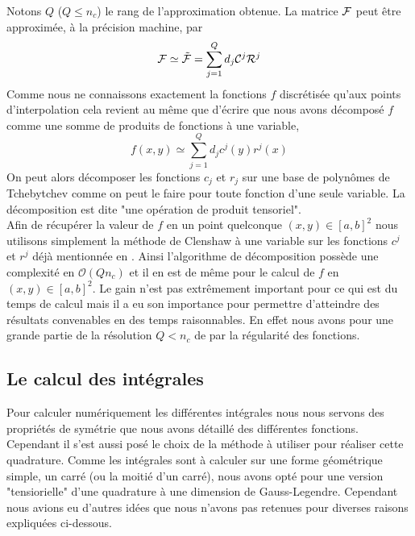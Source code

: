 \documentclass[10.5pt]{article}
\begin{document}
\begin{multicols}{2}
Notons $Q$ ($Q \le n_c$) le rang de l'approximation obtenue. La matrice $\mathcal{F} $ peut être approximée, à la précision machine, par  
\begin{equation}
\mathcal{F}  \simeq \tilde{\mathcal{F} } = \sum_{j=1}^Q d_j \mathcal{C} ^j \mathcal{R} ^j
\end{equation}
Comme nous ne connaissons exactement la fonctions $f$ discrétisée qu'aux points d'interpolation cela revient au même que d'écrire que nous avons décomposé $f$ comme une somme de produits de fonctions à une variable,
\begin{equation}
f(x,y) \simeq \sum_{j=1}^Q d_jc^j(y)r^j(x)
\end{equation}
On peut alors décomposer les fonctions $c_j$ et $r_j$ sur une base de polynômes de Tchebytchev comme on peut le faire pour toute fonction d'une seule variable. La décomposition est dite "une opération de produit tensoriel". \\


Afin de récupérer la valeur de $f$ en un point quelconque $(x,y) \in [a,b]^2 $ nous utilisons simplement la méthode de Clenshaw à une variable sur les fonctions $c^j$ et $r^j$ déjà mentionnée en . Ainsi l'algorithme de décomposition possède une complexité en $\mathcal{O}(Q n_c)$ et il en est de même pour le calcul de $f$ en $(x,y) \in [a,b]^2$. Le gain n'est pas extrêmement important pour ce qui est du temps de calcul mais il a eu son importance pour permettre d'atteindre des résultats convenables en des temps raisonnables. En effet nous avons pour une grande partie de la résolution $Q < n_c$ de par la régularité des fonctions. \\



\subsection{Le calcul des intégrales} 

Pour calculer numériquement les différentes intégrales nous nous servons des propriétés de symétrie que nous avons détaillé des différentes fonctions. Cependant il s'est aussi posé le choix de la méthode à utiliser pour réaliser cette quadrature. Comme les intégrales sont à calculer sur une forme géométrique simple, un carré (ou la moitié d'un carré), nous avons opté pour une version "tensiorielle" d'une quadrature à une dimension de Gauss-Legendre. Cependant nous avions eu d'autres idées que nous n'avons pas retenues pour diverses raisons expliquées ci-dessous.



\end{multicols}
\end{document}
